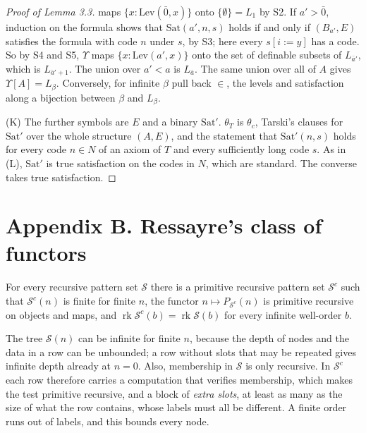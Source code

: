 \documentclass[11pt]{article}
\begin{document}
\begin{proof}[Proof of Lemma 3.3]
maps $\{x : \mathrm{Lev}(\bar 0, x)\}$ onto $\{\emptyset\} = L_1$ by S2. If $a' > \bar 0$, induction on the formula
shows that $\mathrm{Sat}(a', n, s)$ holds if and only if $(B_{a'}, E)$ satisfies the formula with code $n$ under
$s$, by S3; here every $s[i{:=}y]$ has a code. So by S4 and S5, $\Upsilon$ maps $\{x : \mathrm{Lev}(a', x)\}$ onto the
set of definable subsets of $L_{\bar a'}$, which is $L_{\bar a' + 1}$. The union over $a' < a$ is $L_{\bar a}$. The
same union over all of $A$ gives $\Upsilon[A] = L_{\beta}$. Conversely, for infinite $\beta$ pull back $\in$, the
levels and satisfaction along a bijection between $\beta$ and $L_{\beta}$.

(K) The further symbols are $E$ and a binary $\mathrm{Sat}'$. $\theta_T$ is $\theta_c$, Tarski's clauses for
$\mathrm{Sat}'$ over the whole structure $(A, E)$, and the statement that $\mathrm{Sat}'(n, s)$ holds for every
code $n \in N$ of an axiom of $T$ and every sufficiently long code $s$. As in (L), $\mathrm{Sat}'$ is true
satisfaction on the codes in $N$, which are standard. The converse takes true satisfaction.
\end{proof}

\section*{Appendix B. Ressayre's class of functors}

\begin{statement} For every recursive pattern set $\mathcal S$ there is a primitive recursive
pattern set $\mathcal S^c$ such that $\mathcal S^c(n)$ is finite for finite $n$, the functor
$n \mapsto P_{\mathcal S^c}(n)$ is primitive recursive on objects and maps, and
$\operatorname{rk} \mathcal S^c(b) = \operatorname{rk} \mathcal S(b)$ for every infinite well-order $b$.
\end{statement}

The tree $\mathcal S(n)$ can be infinite for finite $n$, because the depth of nodes and the data in a row can be
unbounded; a row without slots that may be repeated gives infinite depth already at $n = 0$. Also, membership in
$\mathcal S$ is only recursive. In $\mathcal S^c$ each row therefore carries a computation that verifies membership,
which makes the test primitive recursive,
and a block of \emph{extra slots}, at least as many as the size of what the row contains, whose labels must all be
different. A finite order runs out of labels, and this bounds every node.
\end{document}

